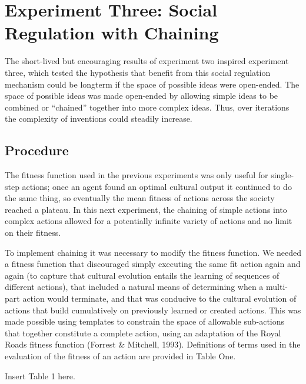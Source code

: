 \documentclass[a4paper,12pt,man,british]{apa6}
\begin{document}
\section{Experiment Three: Social Regulation with Chaining}

The short-lived but encouraging results of experiment two inspired experiment three, which tested the hypothesis that benefit from this social regulation mechanism could be longterm if the space of possible ideas were open-ended. The space of possible ideas was made open-ended by allowing simple ideas to be combined  or ``chained'' together into more complex ideas. Thus, over iterations the complexity of inventions could steadily increase. 

\subsection{Procedure}
The fitness function used in the previous experiments was only useful for single-step actions; once an agent found an optimal cultural output it continued to do the same thing, so eventually the mean fitness of actions across the society reached a plateau. In this next experiment, the chaining of simple actions into complex actions allowed for a potentially infinite variety of actions and no limit on their fitness.
 
To implement chaining it was necessary to modify the fitness function. We needed a fitness function that discouraged simply executing the same fit action again and again (to capture that cultural evolution entails the learning of sequences of different actions), that included a natural means of determining when a multi-part action would terminate, and that was conducive to the cultural evolution of actions that build cumulatively on previously learned or created actions. This was made possible using templates to constrain the space of allowable sub-actions that together constitute a complete action, using an adaptation of the Royal Roads fitness function (Forrest \& Mitchell, 1993). Definitions of terms used in the evaluation of the fitness of an action are provided in Table One. 

\begin{center}
Insert Table 1 here.
\end{center}
\end{document}

